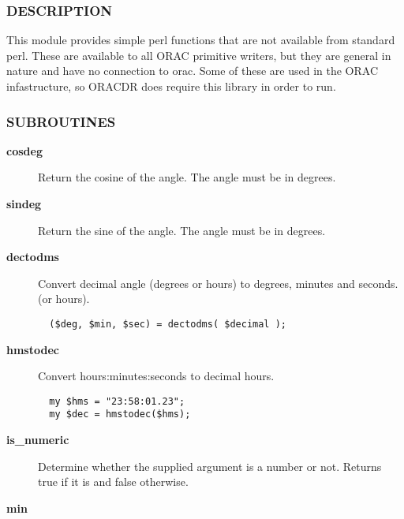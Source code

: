\begin{description}
\subsubsection*{DESCRIPTION\label{ORAC::General_DESCRIPTION}}


This module provides simple perl functions that are not available
from standard perl. These are available to all ORAC primitive writers,
but they are general in nature and have no connection to orac. Some of
these are used in the ORAC infastructure, so ORACDR does require this
library in order to run.

\subsubsection*{SUBROUTINES\label{ORAC::General_SUBROUTINES}}
\begin{description}

\item[{\textbf{cosdeg}}] \mbox{}

Return the cosine of the angle. The angle must be in degrees.


\item[{\textbf{sindeg}}] \mbox{}

Return the sine of the angle. The angle must be in degrees.


\item[{\textbf{dectodms}}] \mbox{}

Convert decimal angle (degrees or hours) to degrees, minutes and seconds.
(or hours).

\begin{verbatim}
  ($deg, $min, $sec) = dectodms( $decimal );
\end{verbatim}

\item[{\textbf{hmstodec}}] \mbox{}

Convert hours:minutes:seconds to decimal hours.

\begin{verbatim}
  my $hms = "23:58:01.23";
  my $dec = hmstodec($hms);
\end{verbatim}

\item[{\textbf{is\_numeric}}] \mbox{}

Determine whether the supplied argument is a number or not.
Returns true if it is and false otherwise.


\item[{\textbf{min}}] \mbox{}


\end{description}
\end{description}
